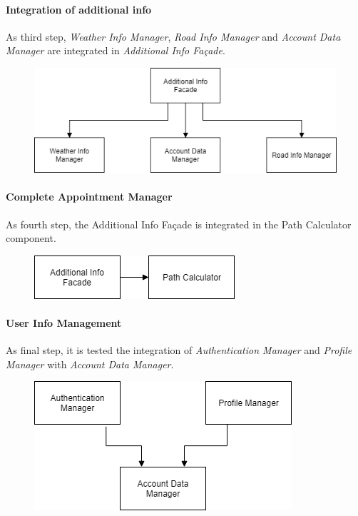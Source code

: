 \paragraph*{Integration of additional info\\}
As third step, \emph{Weather Info Manager}, \emph{Road Info Manager} and \emph{Account Data Manager} are integrated in \emph{Additional Info Façade}.

\begin{figure}[H]
	\centering
	\includegraphics[width=\textwidth, keepaspectratio=true]{Img/ThirdStep}
\end{figure}

\paragraph*{Complete Appointment Manager\\}
As fourth step, the Additional Info Façade is integrated in the Path Calculator component.

\begin{figure}[H]
	\centering
	\includegraphics{Img/FourthStep}
\end{figure}

\paragraph*{User Info Management\\}
As final step, it is tested the integration of \emph{Authentication Manager} and \emph{Profile Manager} with \emph{Account Data Manager}.

\begin{figure}[H]
	\centering
	\includegraphics[scale=0.8]{Img/FifthStep}
\end{figure}

